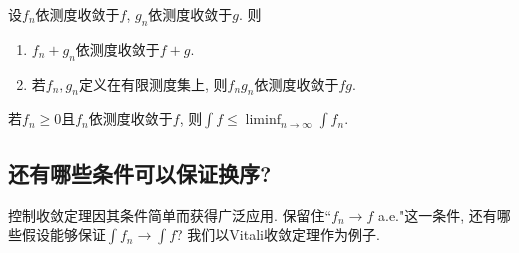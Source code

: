 \begin{example}
    设$f_n$依测度收敛于$f$, $g_n$依测度收敛于$g$. 则
    \begin{enumerate}
    \item $f_n+g_n$依测度收敛于$f+g$.
    \item 若$f_n, g_n$定义在有限测度集上, 则$f_ng_n$依测度收敛于$fg$. 
    \end{enumerate}
\end{example}

\begin{exercise}
    若$f_n \geq 0$且$f_n$依测度收敛于$f$, 则$\int f \leq \liminf_{n \to \infty}\int f_n$.
\end{exercise}




\subsection{还有哪些条件可以保证换序?}
控制收敛定理因其条件简单而获得广泛应用. 保留住``$f_n \to f$ a.e."这一条件, 还有哪些假设能够保证$\int f_n \to \int f$? 我们以Vitali收敛定理作为例子. 

